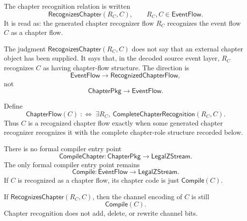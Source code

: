 \begin{definition}
\label{def:chapter-generated-recognition-relation}
The chapter recognition relation is written
$$
  \mathsf{RecognizesChapter}(R_C,C),
  \qquad
  R_C,C\in\mathsf{EventFlow}.
$$
It is read as: the generated chapter recognizer flow $R_C$ recognizes the event flow $C$ as a chapter flow.
\end{definition}

\begin{remark}
\label{rem:chapter-generated-recognition-not-input}
The judgment $\mathsf{RecognizesChapter}(R_C,C)$ does not say that an external chapter object has been supplied. It says that, in the decoded source event layer, $R_C$ recognizes $C$ as having chapter-flow structure. The direction is
$$
  \mathsf{EventFlow}
  \longrightarrow
  \mathsf{RecognizedChapterFlow},
$$
not
$$
  \mathsf{ChapterPkg}
  \longrightarrow
  \mathsf{EventFlow}.
$$
\end{remark}

\begin{definition}
\label{def:chapter-generated-recognized-chapter-flow}
Define
$$
  \mathsf{ChapterFlow}(C)
  \;:\Longleftrightarrow\;
  \exists R_C,\ \mathsf{CompleteChapterRecognition}(R_C,C).
$$
Thus $C$ is a recognized chapter flow exactly when some generated chapter recognizer recognizes it with the complete chapter-role structure recorded below.
\end{definition}

\begin{principle}
\label{prin:chapter-generated-no-external-input}
There is no formal compiler entry point
$$
  \mathsf{CompileChapter}:\mathsf{ChapterPkg}\to\mathsf{LegalZStream}.
$$
The only formal compiler entry point remains
$$
  \mathsf{Compile}:\mathsf{EventFlow}\to\mathsf{LegalZStream}.
$$
If $C$ is recognized as a chapter flow, its chapter code is just $\mathsf{Compile}(C)$.
\end{principle}

\begin{proposition}
\label{prop:chapter-generated-recognition-preserves-code}
If $\mathsf{RecognizesChapter}(R_C,C)$, then the channel encoding of $C$ is still
$$
  \mathsf{Compile}(C).
$$
Chapter recognition does not add, delete, or rewrite channel bits.
\end{proposition}

